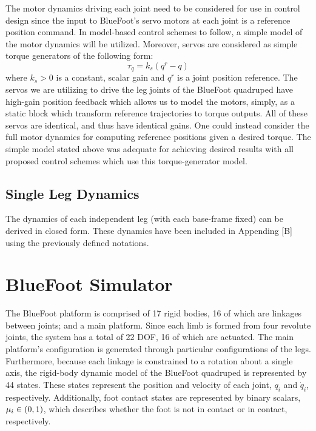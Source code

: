 			The motor dynamics driving each joint need to be considered for use in control design since the input to BlueFoot's servo motors at each joint is a reference position command. In model-based control schemes to follow, a simple model of the motor dynamics will be utilized. Moreover, servos are considered as simple torque generators of the following form:
				\begin{equation}
					\tau_{q} = k_{s}(q^{r}-q)
					\label{eq::servo_control_dynamics}
				\end{equation}
			where $k_{s}>0$ is a constant, scalar gain and $q^{r}$ is a joint position reference. The servos we are utilizing to drive the leg joints of the BlueFoot quadruped have high-gain position feedback which allows us to model the motors, simply, as a static block which transform reference trajectories to torque outputs. All of these servos are identical, and thus have identical gains. One could instead consider the full motor dynamics for computing reference positions given a desired torque. The simple model stated above was adequate for achieving desired results with all proposed control schemes which use this torque-generator model.


		\subsection{Single Leg Dynamics}
			
			The dynamics of each independent leg (with each base-frame fixed) can be derived in closed form. These dynamics have been included in Appending [B] using the previously defined notations.


	\section{BlueFoot Simulator}

		The BlueFoot platform is comprised of 17 rigid bodies, 16 of which are linkages between joints; and a main platform. Since each limb is formed from four revolute joints, the system has a total of 22 DOF, 16 of which are actuated. The main platform's configuration is generated through particular configurations of the legs. Furthermore, because each linkage is constrained to a rotation about a single axis, the rigid-body dynamic model of the BlueFoot quadruped is represented by 44 states. These states represent the position and velocity of each joint, $q_{i}$ and $\dot{q}_{i}$, respectively. Additionally, foot contact states are represented by binary scalars, $\mu_{i} \in \left(0,1\right)$, which describes whether the foot is not in contact or in contact, respectively.

